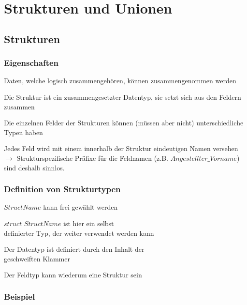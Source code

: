 \section{Strukturen und Unionen }
	\subsection{Strukturen }
		\subsubsection{Eigenschaften}
			\begin{compactitem}
				\item Daten, welche logisch zusammengehören, können zusammengenommen werden
				\item Die Struktur ist ein zusammengesetzter Datentyp, sie setzt sich aus den Feldern zusammen
				\item Die einzelnen Felder der Strukturen können (müssen aber nicht) unterschiedliche Typen haben
				\item Jedes Feld wird mit einem innerhalb der Struktur eindeutigen Namen versehen $\rightarrow$ Strukturspezifische Präfixe für die Feldnamen (z.B. $Angestellter\_Vorname$) sind deshalb sinnlos. 
			\end{compactitem}
		
	\begin{minipage}[t]{10 cm}
		\subsubsection{Definition von Strukturtypen}
			\vspace*{-0.2cm}
			
			\vspace*{0.3cm}
			\begin{compactitem}
				\item $StructName$ kann frei gewählt werden
				\item $struct$ $StructName$ ist hier ein selbst\\ definierter Typ, der weiter verwendet werden kann
				\item Der Datentyp ist definiert durch den Inhalt der\\ geschweiften Klammer
				\item Der Feldtyp kann wiederum eine Struktur sein
			\end{compactitem}
	\end{minipage}
		\hspace*{0.5cm}	
	\begin{minipage}[t]{8 cm}
		\subsubsection{Beispiel}
			\vspace*{-0.2cm}
			
	\end{minipage}
	
